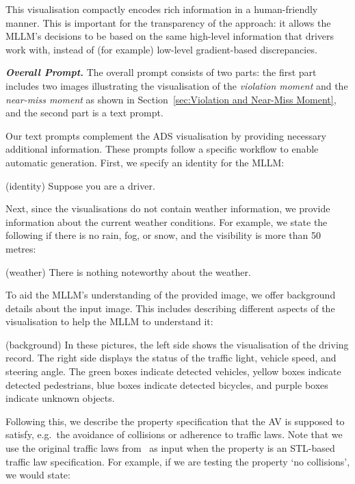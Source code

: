 This visualisation compactly encodes rich information in a human-friendly manner.
This is important for the transparency of the approach: it allows the MLLM's decisions to be based on the same high-level information that drivers work with, instead of (for example) low-level gradient-based discrepancies.



\noindent \emph{\textbf{Overall Prompt.}}
The overall prompt consists of two parts: the first part includes two images illustrating the visualisation of the \emph{violation moment} and the \emph{near-miss moment} as shown in Section~\ref{sec:Violation and Near-Miss Moment}, and the second part is a text prompt.

Our text prompts complement the ADS visualisation by providing necessary additional information. These prompts follow a specific workflow to enable automatic generation. 
First, we specify an identity for the MLLM:
\vspace{-0.15cm}\begin{promptbox}\small
\vspace{-0.15cm}
(identity) Suppose you are a driver.
\vspace{-0.15cm}
\end{promptbox}\vspace{-0.15cm}

Next, since the visualisations do not contain weather information, we provide information about the current weather conditions. For example, we state the following if there is no rain, fog,  or snow, and the visibility is more than 50 metres:
\vspace{-0.15cm}\begin{promptbox}\small
\vspace{-0.15cm}
(weather) There is nothing noteworthy about the weather.
\vspace{-0.15cm}
\end{promptbox}\vspace{-0.15cm}
To aid the MLLM's understanding of the provided image, we offer background details about the input image. This includes describing different aspects of the visualisation to help the MLLM to understand it:
\vspace{-0.15cm}\begin{promptbox}\small
\vspace{-0.15cm}
(background) In these pictures, the left side shows the visualisation of the driving record. 
The right side displays the status of the traffic light, vehicle speed, and steering angle. 
The green boxes indicate detected vehicles, yellow boxes indicate detected pedestrians, blue boxes indicate detected bicycles, and purple boxes indicate unknown objects.
\vspace{-0.15cm}
\end{promptbox}\vspace{-0.15cm}
Following this, we describe the property specification that the AV is supposed to satisfy, e.g.~the avoidance of collisions or adherence to traffic laws. 
Note that we use the original traffic laws from~\cite{China_traffic_law} as input when the property is an STL-based traffic law specification.
For example, if we are testing the property `no collisions', we would state:


